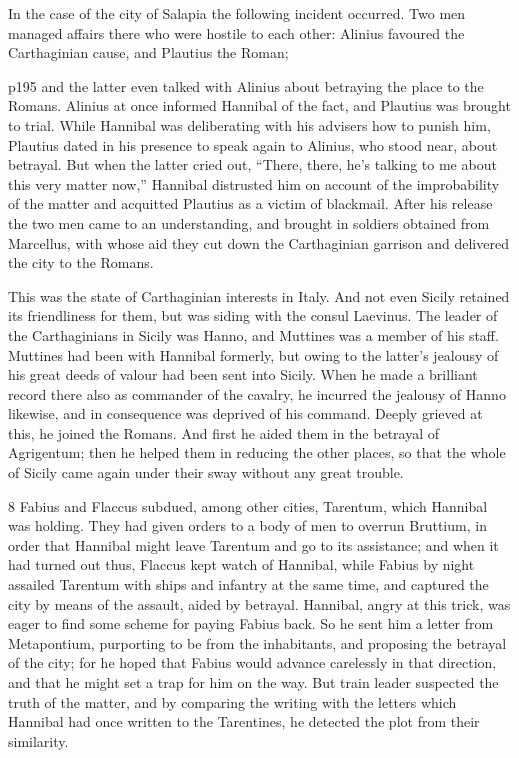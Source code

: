 In the case of the city of Salapia the following incident occurred. Two men managed affairs there who were hostile to each other: Alinius\texthebrew{⁠} favoured the Carthaginian cause, and Plautius\texthebrew{⁠} the Roman;

p195 and the latter even talked with Alinius about betraying the place to the Romans. Alinius at once informed Hannibal of the fact, and Plautius was brought to trial. While Hannibal was deliberating with his advisers how to punish him, Plautius dated in his presence to speak again to Alinius, who stood near, about betrayal. But when the latter cried out, ``There, there, he's talking to me about this very matter now,'' Hannibal distrusted him on account of the improbability of the matter and acquitted Plautius as a victim of blackmail. After his release the two men came to an understanding, and brought in soldiers obtained from Marcellus, with whose aid they cut down the Carthaginian garrison and delivered the city to the Romans.

This was the state of Carthaginian interests in Italy. And not even Sicily retained its friendliness for them, but was siding with the consul Laevinus. The leader of the Carthaginians in Sicily was Hanno, and Muttines was a member of his staff. Muttines had been with Hannibal formerly, but owing to the latter's jealousy of his great deeds of valour had been sent into Sicily. When he made a brilliant record there also as commander of the cavalry, he incurred the jealousy of Hanno likewise, and in consequence was deprived of his command. Deeply grieved at this, he joined the Romans. And first he aided them in the betrayal of Agrigentum; then he helped them in redu­cing the other places, so that the whole of Sicily came again under their sway without any great trouble.

8
Fabius and Flaccus subdued, among other cities, Tarentum, which Hannibal was holding. They had given orders to a body of men to overrun Bruttium, in order that Hannibal might leave Tarentum and go to its assistance; and when it had turned out thus, Flaccus kept watch of Hannibal, while Fabius by night assailed Tarentum with ships and infantry at the same time, and captured the city by means of the assault, aided by betrayal. Hannibal, angry at this trick, was eager to find some scheme for paying Fabius back. So he sent him a letter from Metapontium, purporting to be from the inhabitants, and proposing the betrayal of the city; for he hoped that Fabius would advance carelessly in that direction, and that he might set a trap for him on the way. But train leader suspected the truth of the matter, and by comparing the writing with the letters which Hannibal had once written to the Tarentines, he detected the plot from their similarity.

